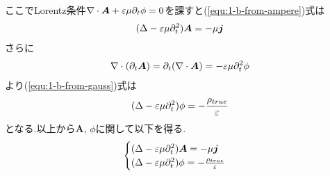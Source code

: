 ここでLorentz条件$\nabla\cdot{\bm A}+\varepsilon\mu\partial_t\phi=0$を課すと(\ref{equ:1-b-from-ampere})式は
\begin{align}
  (\Delta-\varepsilon\mu\partial_t^2){\bm A} =-\mu{\bm j}
\end{align}
さらに
\begin{align*}
  \nabla\cdot(\partial_t{\bm A})=\partial_t(\nabla\cdot{\bm A})=-\varepsilon\mu\partial_t^2\phi
\end{align*}
より(\ref{equ:1-b-from-gauss})式は
\begin{align}
  (\Delta-\varepsilon\mu\partial_t^2)\phi=-\frac{\rho_{true}}{\varepsilon}
\end{align}
となる.以上から${\bm A}$, $\phi$に関して以下を得る.
\begin{align*}
  \begin{cases}
    (\Delta-\varepsilon\mu\partial_t^2){\bm A} =-\mu{\bm j} \\
    (\Delta-\varepsilon\mu\partial_t^2)\phi=-\frac{\rho_{true}}{\varepsilon}
  \end{cases}
\end{align*}